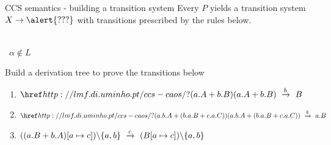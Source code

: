 \documentclass[aspectratio=169]{beamer}
\begin{document}
\begin{slide}{CCS semantics - building a transition system}
\small 
Every $P$ yields a transition system $X \to {\alert{???}}$ with transitions prescribed by the rules below.

\vspace*{-1mm}
\centering
\newcommand{\msep}{~~~~~~}

\msep
{} %
\msep
{} %
\\[3mm]
~${\alpha%
                                                                  \notin L}$
\msep
{}
\\[6mm]

\pause

\begin{exampleblock}{\exercise Build a derivation tree to prove the transitions below}
  \vspace*{-2mm}
  \begin{enumerate}
    \item $\goOn{(a.A + b.B)} ~\trans{b}~ B$
    \item $\goOn{(a.b.A + (b.a.B + c.a.C))} ~\trans{b}~ a.B$
    \item $((a.B + b.A)[a \mapsto c])\backslash\{a,b\} ~\xrightarrow{c}~ (B[a\mapsto c])\backslash\{a,b\}$
  \end{enumerate}
\end{exampleblock}

\end{slide}
\end{document}
